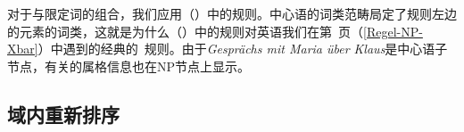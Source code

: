 \z
对于\nbar 与限定词的组合，我们应用（）中的规则。中心语的词类范畴局定了规则左边的元素的词类，这就是为什么（）中的规则对英语我们在第~\pageref{Regel-NP-Xbar}页（\ref{Regel-NP-Xbar}）中遇到的经典的\xbar~规则。由于\emph{Gesprächs mit Maria über Klaus}是中心语子节点，有关\nbar 的属格信息也在NP节点上显示。

\subsection{域内重新排序}
\label{GPSG-lokale-Umstellung}\label{sec-IDLP-intro}

